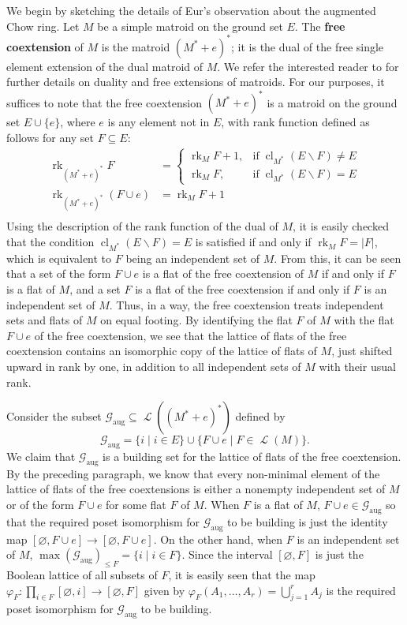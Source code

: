 \documentclass[11pt, reqno]{amsart}
\newcommand{\abs}[1]{\left\vert #1 \right\vert}
\DeclareMathOperator{\augmented}{aug}
\newcommand{\aug}{{\augmented}}
\DeclareMathOperator{\cl}{cl}
\renewcommand{\emptyset}{\varnothing}
\DeclareMathOperator{\LL}{\mathcal{L}}
\renewcommand{\phi}{\varphi}
\DeclareMathOperator{\rk}{rk}
\renewcommand{\setminus}{\smallsetminus}
\newcommand{\term}[1]{\textbf{\textsf{#1}}}
\theoremstyle{definition}
\numberwithin{equation}{section}
\numberwithin{table}{section}
\begin{document}
\begin{spacing}{1.1}
We begin by sketching the details of Eur's observation about the augmented Chow ring.  Let $M$ be a simple matroid on the ground set $E$.  The \term{free coextension} of $M$ is the matroid $(M^* + e)^*$; it is the dual of the free single element extension of the dual matroid of $M$.  We refer the interested reader to \cite[Sections 2.1, 7.2]{Oxl11} for further details on duality and free extensions of matroids.  For our purposes, it suffices to note that the free coextension $(M^* + e)^*$ is a matroid on the ground set $E \cup \{e\}$, where $e$ is any element not in $E$, with rank function defined as follows for any set $F \subseteq E$: \vspace{0.5 em}
\begin{align*}
\rk_{(M^* + e)^*} F &= \left\{\begin{array}{ll}
\rk_M F + 1, & \text{if}\; \cl_{M^*}(E \setminus F) \neq E \\[0.5 em]
\rk_M F, & \text{if}\; \cl_{M^*}(E \setminus F) = E
\end{array}\right. \\[0.5 em]
\rk_{(M^* + e)^*}(F \cup e) &= \rk_M F + 1 \\[-0.5 em]
\end{align*}
Using the description of the rank function of the dual of $M$, it is easily checked that the condition $\cl_{M^*}(E \setminus F) = E$ is satisfied if and only if $\rk_M F = \abs{F}$, which is equivalent to $F$ being an independent set of $M$.  From this, it can be seen that a set of the form $F \cup e$ is a flat of the free coextension of $M$ if and only if $F$ is a flat of $M$, and a set $F$ is a flat of the free coextension if and only if $F$ is an independent set of $M$.  Thus, in a way, the free coextension treats independent sets and flats of $M$ on equal footing.  By identifying the flat $F$ of $M$ with the flat $F \cup e$ of the free coextension, we see that the lattice of  flats of the free coextension contains an isomorphic copy of the lattice of flats of $M$, just shifted upward in rank by one, in addition to all independent sets of $M$ with their usual rank.  

Consider the subset $\mathcal{G}_\aug \subseteq \LL((M^* + e)^*)$ defined by
\[
\mathcal{G}_\aug = \{ i \mid i \in E\} \cup \{F \cup e \mid F \in \LL(M) \}.
\]
We claim that $\mathcal{G}_\aug$ is a building set for the lattice of flats of the free coextension.  By the preceding paragraph, we know that every non-minimal element of the lattice of flats of the free coextensions is either a nonempty independent set of $M$ or of the form $F \cup e$ for some flat $F$ of $M$.  When $F$ is a flat of $M$, $F \cup e \in \mathcal{G}_\aug$ so that the required poset isomorphism for $\mathcal{G}_\aug$ to be building is just the identity map $[\emptyset, F \cup e] \to [\emptyset, F \cup e]$.  On the other hand, when $F$ is an independent set of $M$, $\max (\mathcal{G}_\aug)_{\leq F} = \{ i \mid i \in F\}$.  Since the interval $[\emptyset, F]$ is just the Boolean lattice of all subsets of $F$, it is easily seen that the map $\phi_F: \prod_{i \in F} [\emptyset, i] \to [\emptyset, F]$ given by $\phi_F(A_1, \dots, A_r) = \bigcup_{j = 1}^r A_j$ is the required poset isomorphism for $\mathcal{G}_\aug$ to be building.


\end{spacing}
\end{document}
